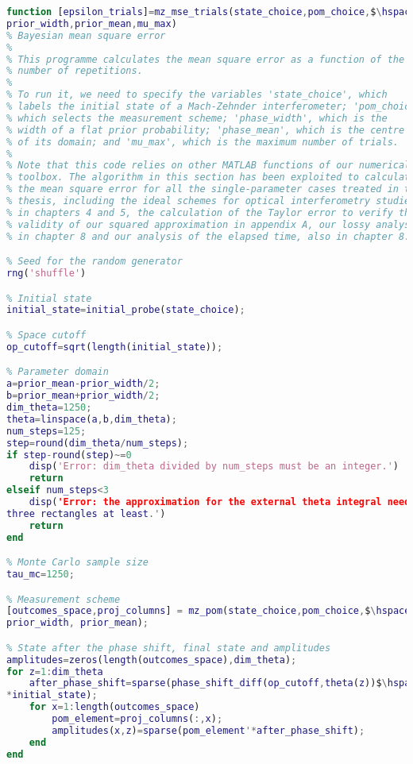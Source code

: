 \begin{lstlisting}[language=Matlab, mathescape=true]
function [epsilon_trials]=mz_mse_trials(state_choice,pom_choice,$\hspace{0.15em}\swarrow$
prior_width,prior_mean,mu_max)
% Bayesian mean square error
%
% This programme calculates the mean square error as a function of the
% number of repetitions.
%
% To run it, we need to specify the variables 'state_choice', which 
% labels the initial state of a Mach-Zehnder interferometer; 'pom_choice',
% which selects the measurement scheme; 'phase_width', which is the 
% width of a flat prior probability; 'phase_mean', which is the centre
% of its domain; and 'mu_max', which is the maximum number of trials.
%
% Note that this code relies on other MATLAB functions of our numerical
% toolbox. The algorithm in this section has been exploited to calculate
% the mean square error for all the single-parameter cases treated in this 
% thesis, including the ideal schemes for optical interferometry studied 
% in chapters 4 and 5, the calculation of the Taylor error to verify the
% validity of our squared approximation in appendix A, our lossy analysis 
% in chapter 8 and our analysis of the elapsed time, also in chapter 8.

% Seed for the random generator
rng('shuffle') 

% Initial state
initial_state=initial_probe(state_choice);

% Space cutoff
op_cutoff=sqrt(length(initial_state));

% Parameter domain
a=prior_mean-prior_width/2;
b=prior_mean+prior_width/2;
dim_theta=1250;
theta=linspace(a,b,dim_theta);
num_steps=125;
step=round(dim_theta/num_steps);
if step-round(step)~=0
    disp('Error: dim_theta divided by num_steps must be an integer.')
    return
elseif num_steps<3
    disp('Error: the approximation for the external theta integral needs$\hspace{0.15em}\swarrow$
three rectangles at least.')
    return
end

% Monte Carlo sample size
tau_mc=1250;    

% Measurement scheme
[outcomes_space,proj_columns] = mz_pom(state_choice,pom_choice,$\hspace{0.15em}\swarrow$
prior_width, prior_mean);

% State after the phase shift, final state and amplitudes
amplitudes=zeros(length(outcomes_space),dim_theta);
for z=1:dim_theta
    after_phase_shift=sparse(phase_shift_diff(op_cutoff,theta(z))$\hspace{0.15em}\swarrow$
*initial_state);
    for x=1:length(outcomes_space)        
        pom_element=proj_columns(:,x);
        amplitudes(x,z)=sparse(pom_element'*after_phase_shift);
    end             
end


\end{lstlisting}
